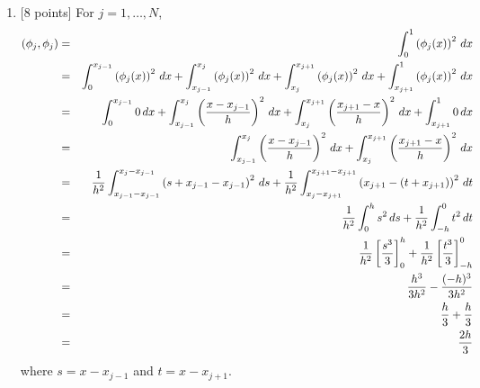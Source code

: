 \begin{solution}
\begin{enumerate}
\item {[8 points]} For $j=1,\ldots,N$,
\begin{eqnarray*}
(\phi_j, \phi_j) &=& \int_0^1\left(\phi_j(x)\right)^2\, dx
\\
&=& \int_0^{x_{j-1}}\left(\phi_j(x)\right)^2\, dx+\int_{x_{j-1}}^{x_j}\left(\phi_j(x)\right)^2\, dx+\int_{x_j}^{x_{j+1}}\left(\phi_j(x)\right)^2\, dx+\int_{x_{j+1}}^1\left(\phi_j(x)\right)^2\, dx
\\
&=& \int_0^{x_{j-1}}0\, dx+\int_{x_{j-1}}^{x_j} \left({x-x_{j-1} \over h}\right)^2\, dx + \int_{x_j}^{x_{j+1}} \left({x_{j+1}-x \over h}\right)^2\, dx+\int_{x_{j+1}}^10\, dx
\\
&=& \int_{x_{j-1}}^{x_j} \left({x-x_{j-1} \over h}\right)^2\, dx + \int_{x_j}^{x_{j+1}} \left({x_{j+1}-x \over h}\right)^2\, dx
\\
&=& {1\over h^2}\int_{x_{j-1}-x_{j-1}}^{x_j-x_{j-1}} \left(s+x_{j-1}-x_{j-1}\right)^2\, ds + {1\over h^2}\int_{x_j-x_{j+1}}^{x_{j+1}-x_{j+1}} \left(x_{j+1}-\left(t+x_{j+1}\right)\right)^2\, dt
\\
&=& {1\over h^2}\int_0^h s^2\, ds + {1\over h^2}\int_{-h}^0 t^2\, dt
\\
&=& {1\over h^2}\left[ {s^3 \over 3}\right]_0^h+{1\over h^2}\left[ {t^3 \over 3}\right]_{-h}^0
\\
&=& {h^3 \over 3h^2} - {(-h)^3 \over 3h^2}
\\
&=& {h \over 3} + {h \over 3}
\\
&=& {2h\over 3}
\end{eqnarray*}
where $s=x-x_{j-1}$ and $t=x-x_{j+1}$.


\end{enumerate}
\end{solution}
